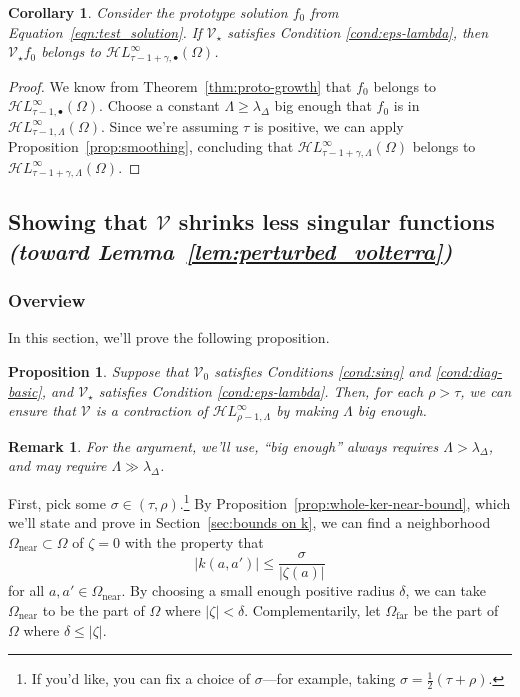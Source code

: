 \documentclass{article}
\theoremstyle{plain}
\newtheorem{prop}{Proposition}
\newtheorem{rmk}{Remark}
\newtheorem{cor}{Corollary}
\newcommand{\singexp}[2]{\mathcal{H}L^\infty_{#1, #2}}
\newcommand{\singexpalg}[1]{\singexp{#1}{\bullet}}
\newcommand{\volterra}{\mathcal{V}}
\newcommand{\hardpart}{\mathcal{V}_0}
\newcommand{\softpart}{\mathcal{V}_\star}
\newcommand{\solproto}{f_0}
\newcommand{\domain}{\Omega}
\newcommand{\near}{\Omega_\text{near}}
\newcommand{\far}{\Omega_\text{far}}
\begin{document}
\begin{cor}\label{cor:pertub_f0}
Consider the prototype solution $\solproto$ from Equation~\eqref{eqn:test_solution}. If $\softpart$ satisfies {\em Condition \eqref{cond:eps-lambda}}, then $\softpart \solproto$ belongs to $\singexpalg{\tau-1+\gamma}(\domain)$.
\end{cor}
\begin{proof}
We know from Theorem~\ref{thm:proto-growth} that $\solproto$ belongs to $\singexpalg{\tau-1}(\domain)$. Choose a constant $\Lambda \ge \lambda_\Delta$ big enough that $\solproto$ is in $\singexp{\tau-1}{\Lambda}(\domain)$. Since we're assuming $\tau$ is positive, we can apply Proposition~\ref{prop:smoothing}, concluding that $\singexp{\tau-1+\gamma}{\Lambda}(\domain)$ belongs to $\singexp{\tau-1+\gamma}{\Lambda}(\domain)$.
\end{proof}
\subsection{Showing that $\volterra$ shrinks less singular functions \\ \textit{(toward Lemma~\ref{lem:perturbed_volterra})}}\label{sec:V is a contraction}
\subsubsection{Overview}
In this section, we'll prove the following proposition. %

\begin{prop}\label{prop:get-contraction}
Suppose that $\hardpart$ satisfies {\em Conditions \eqref{cond:sing}} and \eqref{cond:diag-basic}, and $\softpart$ satisfies {\em Condition \eqref{cond:eps-lambda}}. Then, for each $\rho > \tau$, we can ensure that $\volterra$ is a contraction of $\singexp{\rho-1}{\Lambda}$ by making $\Lambda$ big enough.
\end{prop}
\begin{rmk}
For the argument, we'll use, ``big enough'' always requires $\Lambda > \lambda_\Delta$, and may require $\Lambda \gg \lambda_\Delta$.
\end{rmk}
First, pick some $\sigma \in (\tau, \rho)$.\footnote{If you'd like, you can fix a choice of $\sigma$---for example, taking $\sigma = \frac{1}{2}(\tau + \rho)$.} By Proposition~\ref{prop:whole-ker-near-bound}, which we'll state and prove in Section~\ref{sec:bounds on k}, we can find a neighborhood $\near \subset \domain$ of $\zeta = 0$ with the property that
\begin{equation}\label{near-limit}
|k(a, a')| \le \frac{\sigma}{|\zeta(a)|}
\end{equation}
for all $a, a' \in \near$. By choosing a small enough positive radius $\delta$, we can take $\near$ to be the part of $\domain$ where $|\zeta| < \delta$. Complementarily, let $\far$ be the part of $\domain$ where $\delta \le |\zeta|$.
\end{document}
